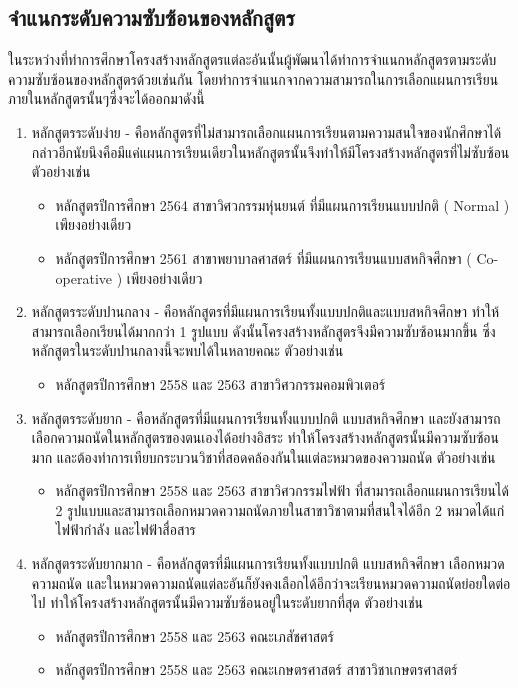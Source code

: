 \subsection{จำแนกระดับความซับซ้อนของหลักสูตร}
ในระหว่างที่ทำการศึกษาโครงสร้างหลักสูตรแต่ละอันนั้นผู้พัฒนาได้ทำการจำแนกหลักสูตรตามระดับความซับซ้อนของหลักสูตรด้วยเช่นกัน 
โดยทำการจำแนกจากความสามารถในการเลือกแผนการเรียนภายในหลักสูตรนั้นๆซึ่งจะได้ออกมาดังนี้
\begin{enumerate}
  \item หลักสูตรระดับง่าย - คือหลักสูตรที่ไม่สามารถเลือกแผนการเรียนตามความสนใจของนักศึกษาได้ กล่าวอีกนัยนึงคือมีแค่แผนการเรียนเดียวในหลักสูตรนั้นจึงทำให้มีโครงสร้างหลักสูตรที่ไม่ซับซ้อน
	ตัวอย่างเช่น
  \begin{itemize}
    \item หลักสูตรปีการศึกษา 2564 สาขาวิศวกรรมหุ่นยนต์ ที่มีแผนการเรียนแบบปกติ ( Normal ) เพียงอย่างเดียว
    \item หลักสูตรปีการศึกษา 2561 สาขาพยาบาลศาสตร์ ที่มีแผนการเรียนแบบสหกิจศึกษา ( Co-operative ) เพียงอย่างเดียว
  \end{itemize}
  \item หลักสูตรระดับปานกลาง - คือหลักสูตรที่มีแผนการเรียนทั้งแบบปกติและแบบสหกิจศึกษา ทำให้สามารถเลือกเรียนได้มากกว่า 1 รูปแบบ ดังนั้นโครงสร้างหลักสูตรจึงมีความซับซ้อนมากขึ้น ซึ่งหลักสูตรในระดับปานกลางนี้จะพบได้ในหลายคณะ
  ตัวอย่างเช่น
  \begin{itemize}
    \item หลักสูตรปีการศึกษา 2558 และ 2563 สาขาวิศวกรรมคอมพิวเตอร์
  \end{itemize}
  \item หลักสูตรระดับยาก - คือหลักสูตรที่มีแผนการเรียนทั้งแบบปกติ แบบสหกิจศึกษา และยังสามารถเลือกความถนัดในหลักสูตรของตนเองได้อย่างอิสระ ทำให้โครงสร้างหลักสูตรนั้นมีความซับซ้อนมาก และต้องทำการเทียบกระบวนวิชาที่สอดคล้องกันในแต่ละหมวดของความถนัด
  ตัวอย่างเช่น
  \begin{itemize}
    \item หลักสูตรปีการศึกษา 2558 และ 2563 สาขาวิศวกรรมไฟฟ้า ที่สามารถเลือกแผนการเรียนได้ 2 รูปแบบและสามารถเลือกหมวดความถนัดภายในสาขาวิชาตามที่สนใจได้อีก 2 หมวดได้แก่ ไฟฟ้ากำลัง และไฟฟ้าสื่อสาร
  \end{itemize}
  \item หลักสูตรระดับยากมาก - คือหลักสูตรที่มีแผนการเรียนทั้งแบบปกติ แบบสหกิจศึกษา เลือกหมวดความถนัด และในหมวดความถนัดแต่ละอันก็ยังคงเลือกได้อีกว่าจะเรียนหมวดความถนัดย่อยใดต่อไป ทำให้โครงสร้างหลักสูตรนั้นมีความซับซ้อนอยู่ในระดับยากที่สุด
  ตัวอย่างเช่น
  \begin{itemize}
    \item หลักสูตรปีการศึกษา 2558 และ 2563 คณะเภสัชศาสตร์
    \item หลักสูตรปีการศึกษา 2558 และ 2563 คณะเกษตรศาสตร์ สาชาวิชาเกษตรศาสตร์
  \end{itemize}
\end{enumerate}

